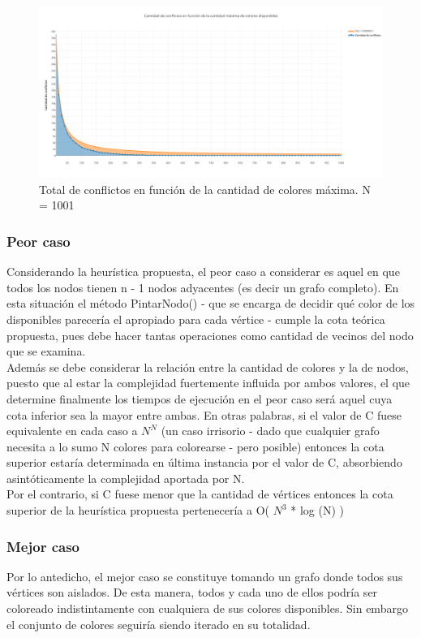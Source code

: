  \begin{figure}[H]
    \begin{center}
  	\includegraphics[width=18cm]{imagenes/Ej3/coloresconflicto.png}
 	\caption{Total de conflictos en función de la cantidad de colores máxima. N = 1001}
 	\label{coloresconflicto}
    \end{center}
  \end{figure}

\subsubsection{Peor caso}
Considerando la heurística propuesta, el peor caso a considerar es aquel en que todos los nodos tienen n - 1 nodos adyacentes (es decir un grafo completo). En esta situación el método PintarNodo() - que  se encarga de decidir qué color de los disponibles parecería el apropiado para cada vértice - cumple la cota teórica propuesta, pues debe hacer tantas operaciones como cantidad de vecinos del nodo que  se examina.\\

Además se debe considerar la relación entre la cantidad de colores y la de nodos, puesto que al estar la complejidad fuertemente influida por ambos valores, el que determine finalmente los tiempos de ejecución en el peor caso será aquel cuya cota inferior sea la mayor entre ambas. En otras palabras, si el valor de C fuese equivalente en cada caso a $N^{N}$  (un caso irrisorio - dado que cualquier grafo necesita a lo sumo N colores para colorearse - pero posible) entonces la cota superior estaría determinada en última instancia por el valor de C, absorbiendo asintóticamente la complejidad aportada por N. \\
Por el contrario, si C fuese menor que la cantidad de vértices entonces la cota superior de la heurística propuesta pertenecería a O( $N^{3}$ * log (N) )


\subsubsection{Mejor caso}
Por lo antedicho, el mejor caso se constituye tomando un grafo donde todos sus vértices son aislados. De esta manera, todos y cada uno de ellos podría ser coloreado indistintamente con cualquiera de sus colores disponibles. Sin embargo el conjunto de colores seguiría siendo iterado en su totalidad.



\newpage
